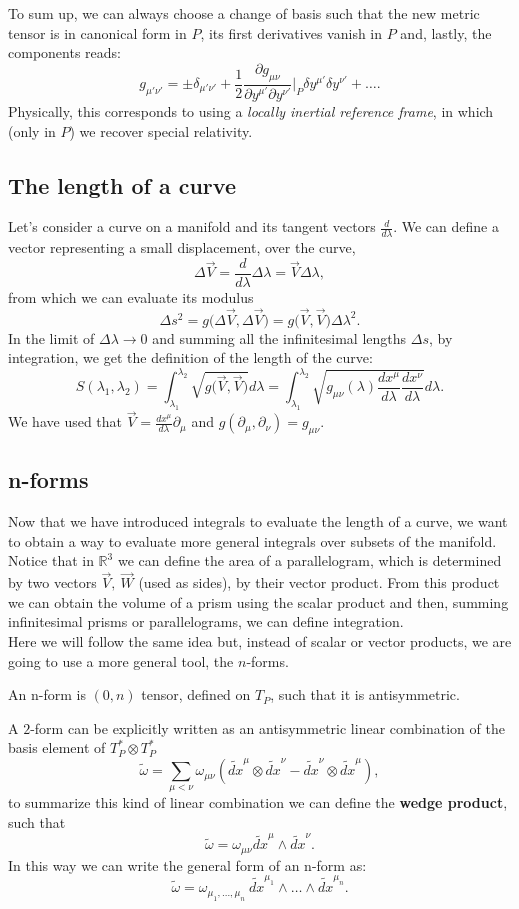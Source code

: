 To sum up, we can always choose a change of basis such that the new metric tensor is in canonical form in $P$, its first derivatives vanish in $P$ and, lastly, the components reads:$$\boxed{g_{\mu'\nu'}=\pm\delta_{\mu'\nu'}+\frac{1}{2}\frac{\partial g_{\mu\nu}}{\partial y^{\mu'}\partial y^{\nu'}}\bigg|_P\delta y^{\mu'}\delta y^{\nu '}+\dots}.$$
Physically, this corresponds to using a \emph{locally inertial reference frame}, in which (only in $P$) we recover special relativity.
\subsection{The length of a curve}
Let's consider a curve on a manifold and its tangent vectors $\frac{d}{d\lambda}$. We can define a vector representing a small displacement, over the curve, $$\Delta \vec{V}=\frac{d}{d\lambda}\Delta \lambda=\vec V\Delta \lambda,$$
from which we can evaluate its modulus $$\Delta s^2=g\big(\Delta \vec V,\Delta \vec V\big)=g\big( \vec V, \vec V\big)\Delta\lambda^2.$$
In the limit of $\Delta \lambda\rightarrow0$ and summing all the infinitesimal lengths $\Delta s$, by integration, we get the definition of the length of the curve:$$\boxed{S(\lambda_1,\lambda_2)=\int_{\lambda_1}^{\lambda_2}\sqrt{g\big(\vec V,\vec V\big)} d\lambda=\int_{\lambda_1}^{\lambda_2}\sqrt{g_{\mu\nu}(\lambda)\frac{dx^\mu}{d\lambda}\frac{dx^\nu}{d\lambda}} d\lambda}.$$
We have used that $\vec V=\frac{d x^\mu}{d\lambda}\partial_\mu$ and $g(\partial_\mu,\partial_\nu)=g_{\mu\nu}$.
\subsection{n-forms}
Now that we  have introduced integrals to evaluate the length of a curve, we want to obtain a way to evaluate more general integrals over subsets of the manifold.\\
Notice that in $\mathbb{R}^3$ we can define the area of a parallelogram, which is determined by two vectors $\vec V,\ \vec W$ (used as sides), by their vector product. From this product we can obtain the volume of a prism using the scalar product and then, summing infinitesimal prisms or parallelograms, we can define integration.\\ Here we will follow the same idea but, instead of scalar or vector products, we are going to use a more general tool, the $n$-forms.
\begin{defin}[n-forms]
    An n-form is $(0,n)$ tensor, defined on $T_P$, such that it is antisymmetric. 
\end{defin}
A $2$-form can be explicitly written as an antisymmetric linear combination of the basis element of $T_P^*\otimes T_P^*$
$$\tilde{\omega}=\sum_{\mu<\nu}\omega_{\mu\nu}(\tilde{dx}^\mu\otimes\tilde{dx}^\nu-\tilde{dx}^\nu\otimes\tilde{dx}^\mu),$$
to summarize this kind of linear combination we can define the \textbf{wedge product}, such that$$\tilde{\omega}=\omega_{\mu\nu}\tilde{dx}^\mu\wedge\tilde{dx}^\nu.$$
In this way we can write the general form of an n-form as:
$$\boxed{\tilde\omega=\omega_{\mu_1,\dots,\mu_n}\ \tilde{dx}^{\mu_1}\wedge\dots\wedge\tilde{dx}^{\mu_n}}.$$
